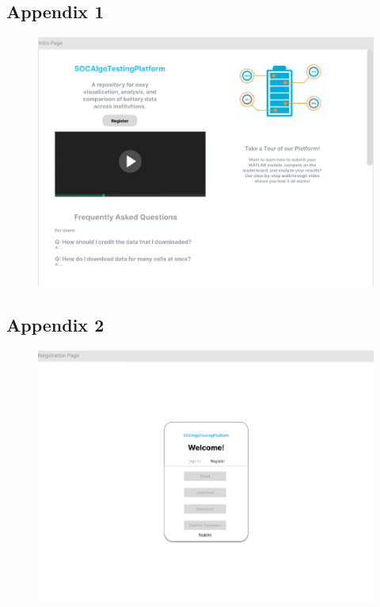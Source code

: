 \documentclass[12pt, titlepage]{article}
\begin{document}
\subsection{Appendix 1} \label{Appendix 1}
\begin{figure}[H]
    \centering
    \includegraphics[width=1\linewidth]{.//Interface/Intro.png}
\end{figure}
\subsection{Appendix 2} \label{Appendix 2}
\begin{figure}[H]
    \centering
    \includegraphics[width=1\linewidth]{.//Interface/Registration.png}
\end{figure}
\end{document}
